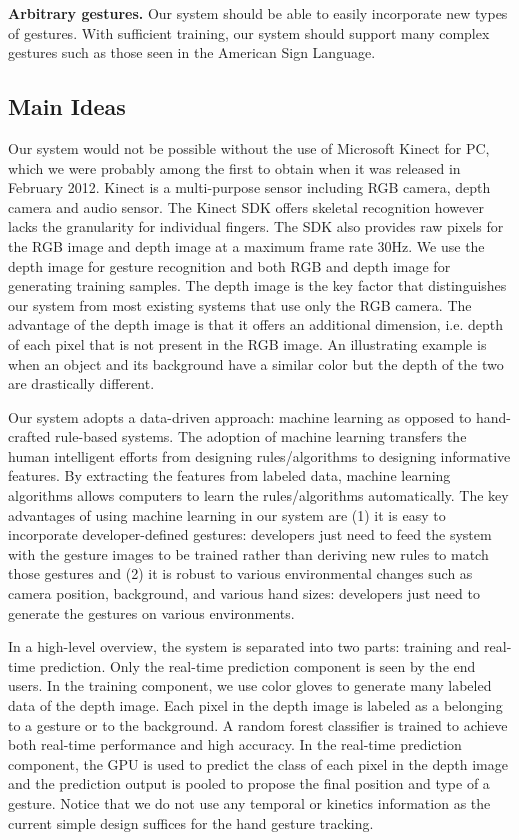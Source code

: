 \textbf{Arbitrary gestures.} Our system should be able to easily incorporate new types of gestures. With sufficient training, our system should support many complex gestures such as those seen in the American Sign Language.

\cutsection
\subsection{Main Ideas}
\cutsection
Our system would not be possible without the use of Microsoft Kinect for PC, which we were probably among the first to obtain when it was released in February 2012. Kinect is a multi-purpose sensor including RGB camera, depth camera and audio sensor. The Kinect SDK offers skeletal recognition however lacks the granularity for individual fingers. The SDK also provides raw pixels for the RGB image and depth image at a maximum frame rate 30Hz. We use the depth image for gesture recognition and both RGB and depth image for generating training samples. The depth image is the key factor that distinguishes our system from most existing systems that use only the RGB camera. The advantage of the depth image is that it offers an additional dimension, i.e. depth of each pixel that is not present in the RGB image. An illustrating example is when an object and its background have a similar color but the depth of the two are drastically different.

Our system adopts a data-driven approach: machine learning as opposed to hand-crafted rule-based systems. The adoption of machine learning transfers the human intelligent efforts from designing rules/algorithms to designing informative features. By extracting the features from labeled data, machine learning algorithms allows computers to learn the rules/algorithms automatically. The key advantages of using machine learning in our system    
are (1) it is easy to incorporate developer-defined gestures: developers just need to feed the system with the gesture images to be trained rather than deriving new rules to match those gestures and (2) it is robust to various environmental changes such as camera position, background, and various hand sizes: developers just need to generate the gestures on various environments. 

In a high-level overview, the system is separated into two parts: training and real-time prediction. Only the real-time prediction component is seen by the end users. In the training component, we use color gloves to generate many labeled data of the depth image. Each pixel in the depth image is labeled as a belonging to a gesture or to the background. A random forest classifier is trained to achieve both real-time performance and high accuracy. In the real-time prediction component, the GPU is used to predict the class of each pixel in the depth image and the prediction output is pooled to propose the final position and type of a gesture. Notice that we do not use any temporal or kinetics information as the current simple design suffices for the hand gesture tracking.

